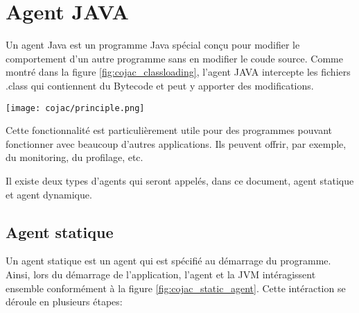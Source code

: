 \begin{minipage}{\linewidth}%
\label{fig:cojac_bytecode_stack_addition}
\end{minipage}

\section{Agent JAVA}

Un agent Java est un programme Java spécial conçu pour modifier le comportement d'un autre programme sans en modifier le coude source. Comme montré dans la figure \ref{fig:cojac_classloading}, l'agent JAVA intercepte les fichiers .class qui contiennent du Bytecode et peut y apporter des modifications.

\begin{minipage}{\linewidth}
    \centering
    \texttt{[image: cojac/principle.png]}
    \label{fig:cojac_classloading}
\end{minipage}

Cette fonctionnalité est particulièrement utile pour des programmes pouvant fonctionner avec beaucoup d'autres applications. Ils peuvent offrir, par exemple, du monitoring, du profilage, etc.

Il existe deux types d'agents qui seront appelés, dans ce document, agent statique et agent dynamique.

\subsection{Agent statique}

Un agent statique est un agent qui est spécifié au démarrage du programme. Ainsi, lors du démarrage de l'application, l'agent et la JVM intéragissent ensemble conformément à la figure \ref{fig:cojac_static_agent}. Cette intéraction se déroule en plusieurs étapes:

